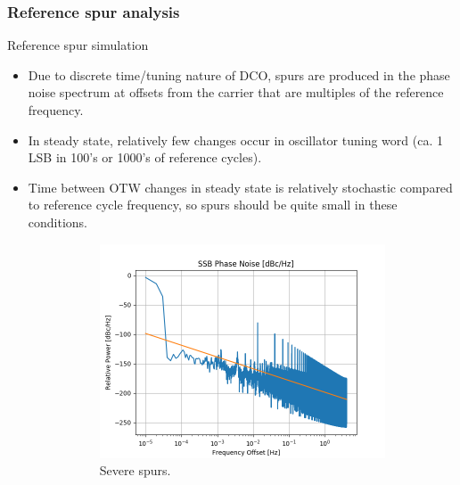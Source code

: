 \documentclass[t, screen, aspectratio=43]{beamer}
\begin{document}
\begin{frame}
	\frametitle{Reference spur analysis}
	\vspace{-0.7em}
	\begin{block}{Reference spur simulation}
		\begin{itemize}
			\scriptsize
			\item Due to discrete time/tuning nature of DCO, spurs are produced in the phase noise spectrum at offsets from the carrier that are multiples of the reference frequency.
			\item In steady state, relatively few changes occur in oscillator tuning word (ca. 1 LSB in 100's or 1000's of reference cycles).
			\item Time between OTW changes in steady state is relatively stochastic compared to reference cycle frequency, so spurs should be quite small in these conditions.
			\vspace{-0.5em}
		\begin{figure}[htb!]
	        \centering
	        \begin{subfigure}{.4\textwidth}
	            \centering
	            \includegraphics[width=0.9\linewidth]{pn_spurs.png}
	            \caption{\scriptsize Severe spurs.}
	            \label{fig:rosc_3stg_cir}
	        \end{subfigure}%
	        \begin{subfigure}{.4\textwidth}
	            \centering

\end{subfigure}
\end{figure}
\end{itemize}
\end{block}
\end{frame}
\end{document}
